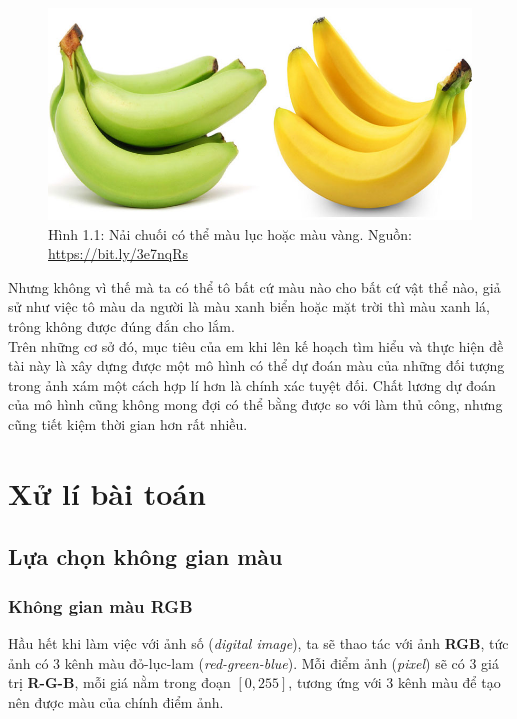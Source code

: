 \documentclass[a4paper]{article}
\begin{document}
\begin{figure}[h!]
\centering
\includegraphics[width=15cm]{images/1_1.jpg}
\caption{Hình 1.1: Nải chuối có thể màu lục hoặc màu vàng. Nguồn: \href{https://bit.ly/3e7nqRs}{https://bit.ly/3e7nqRs}}
\end{figure}

\noindent
Nhưng không vì thế mà ta có thể tô bất cứ màu nào cho bất cứ vật thể nào, giả sử như việc tô màu da người là màu xanh biển hoặc mặt trời thì màu xanh lá, trông không được đúng đắn cho lắm.\\

\noindent
Trên những cơ sở đó, mục tiêu của em khi lên kế hoạch tìm hiểu và thực hiện đề tài này là xây dựng được một mô hình có thể dự đoán màu của những đối tượng trong ảnh xám một cách hợp lí hơn là chính xác tuyệt đối. Chất lương dự đoán của mô hình cũng không mong đợi có thể bằng được so với làm thủ công, nhưng cũng tiết kiệm thời gian hơn rất nhiều.

\section{Xử lí bài toán}

\subsection{Lựa chọn không gian màu}

\subsubsection{Không gian màu RGB}
Hầu hết khi làm việc với ảnh số (\textit{digital image}), ta sẽ thao tác với ảnh \textbf{RGB}, tức ảnh có 3 kênh màu đỏ-lục-lam (\textit{red-green-blue}). Mỗi điểm ảnh (\textit{pixel}) sẽ có 3 giá trị \textbf{R-G-B}, mỗi giá nằm trong đoạn $[0, 255]$, tương ứng với 3 kênh màu để tạo nên được màu của chính điểm ảnh.
\end{document}
